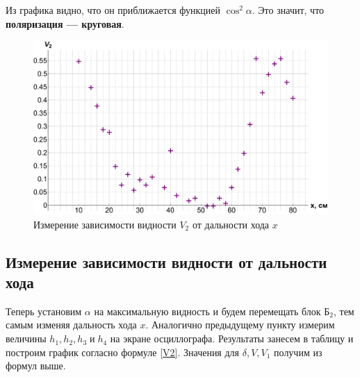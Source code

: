 \documentclass[12pt]{kiarticle}
\begin{document}
Из графика видно, что он приближается функцией $ \cos^2 \alpha $. Это значит, что \textbf{поляризация --- круговая}.

	\begin{figure}[h]
	\label{graf_v2}
	\includegraphics[scale=0.47]{v2.pdf}
	\caption{Измерение зависимости видности $ V_2 $ от дальности хода $ x $}
\end{figure}

\subsection{Измерение зависимости видности от дальности хода}


Теперь установим $ \alpha $ на максимальную видность и будем перемещать блок $ Б_2 $, тем самым изменяя дальность хода $ x $. Аналогично предыдущему пункту измерим величины $ h_1, h_2, h_3 \; и \; h_4 $ на экране осциллографа. Результаты занесем в таблицу и построим график согласно формуле \eqref{V2}. Значения для $ \delta, V, V_1 $ получим из формул выше.
\end{document}
